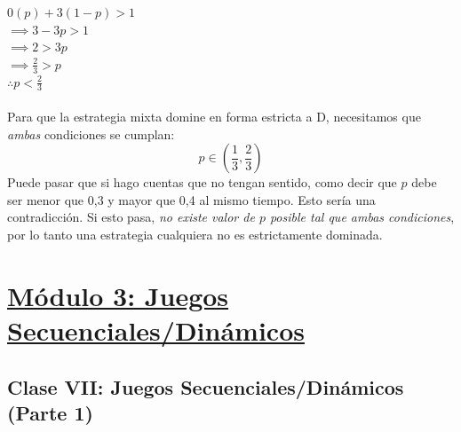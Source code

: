 \documentclass{article}
\begin{document}
                \(0(p)+3(1-p) > 1\) \\
                \(\implies 3-3p > 1\) \\
                \(\implies 2 > 3p\) \\
                \(\implies \frac{2}{3} > p\) \\
                \(\therefore p < \frac{2}{3}\) \\
                \\
                Para que la estrategia mixta domine en forma estricta a D, necesitamos que \emph{ambas} condiciones se cumplan:
                \[p \in \left(\frac{1}{3}, \frac{2}{3}\right)\]
                Puede pasar que si hago cuentas que no tengan sentido, como decir que $p$ debe ser menor que 0,3 y mayor que 0,4 al mismo tiempo. Esto sería una contradicción. Si esto pasa, \emph{no existe valor de $p$ posible tal que ambas condiciones}, por lo tanto una estrategia cualquiera no es estrictamente dominada.
    \section*{\underline{Módulo 3: Juegos Secuenciales/Dinámicos}}
        \subsection*{Clase VII: Juegos Secuenciales/Dinámicos (Parte 1)}    
\end{document}
